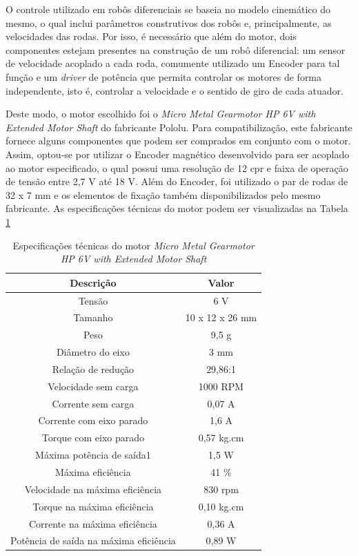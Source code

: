 O controle utilizado em robôs diferenciais se baseia no modelo cinemático do mesmo, o qual inclui parâmetros construtivos dos robôs e, principalmente, as velocidades das rodas. Por isso, é necessário que além do motor, dois componentes estejam presentes na construção de um robô diferencial: um sensor de velocidade acoplado a cada roda, comumente utilizado um Encoder para tal função e um \textit{driver} de potência que permita controlar os motores de forma independente, isto é, controlar a velocidade e o sentido de giro de cada atuador.

Deste modo, o motor escolhido foi o \textit{Micro Metal Gearmotor HP 6V with Extended Motor Shaft} do fabricante Pololu. Para compatibilização, este fabricante fornece alguns componentes que podem ser comprados em conjunto com o motor. Assim, optou-se por utilizar o Encoder magnético desenvolvido para ser acoplado ao motor especificado, o qual possui uma resolução de 12 \gls*{cpr} e faixa de operação de tensão entre 2,7 V até 18 V. Além do Encoder, foi utilizado o par de rodas de 32 x 7 mm e os elementos de fixação também disponibilizados pelo mesmo fabricante. As especificações técnicas do motor podem ser visualizadas na Tabela \ref{tab:especificacao_do_motor}

\begin{table}[H]
	\centering
	\captionsetup{justification=centering}
	\caption{Especificações técnicas do motor \textit{Micro Metal Gearmotor HP 6V with Extended Motor Shaft}}
	\label{tab:especificacao_do_motor}
	\begin{tabular}{c|c}
		\hline
		\textbf{Descrição} & \textbf{Valor} \\ \hline
		Tensão & 6 V \\ \hline
		Tamanho & 10 x 12 x 26 mm \\ \hline
		Peso & 9,5 g \\ \hline
		Diâmetro do eixo & 3 mm \\ \hline
		Relação de redução & 29,86:1 \\ \hline
		Velocidade sem carga & 1000 RPM \\ \hline
		Corrente sem carga & 0,07 A \\ \hline
		Corrente com eixo parado & 1,6 A \\ \hline
		Torque com eixo parado & 0,57 kg.cm \\ \hline
		Máxima potência de saída1 & 1,5 W \\ \hline
		Máxima eficiência & 41 \% \\ \hline
		Velocidade na máxima eficiência & 830 rpm \\ \hline
		Torque na máxima eficiência & 0,10 kg.cm \\ \hline
		Corrente na máxima eficiência & 0,36 A \\ \hline
		Potência de saída na máxima eficiência & 0,89 W \\ \hline
	\end{tabular}
\end{table}

